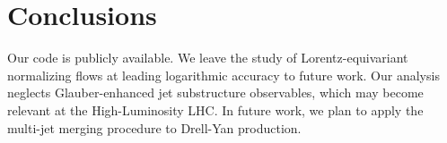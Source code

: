 \section{Conclusions}\label{sec:conclusions}

Our code is publicly available. We leave the study of
Lorentz-equivariant normalizing flows at leading logarithmic accuracy to
future work. Our analysis neglects Glauber-enhanced jet substructure
observables, which may become relevant at the High-Luminosity LHC. In
future work, we plan to apply the multi-jet merging procedure to
Drell-Yan production.


